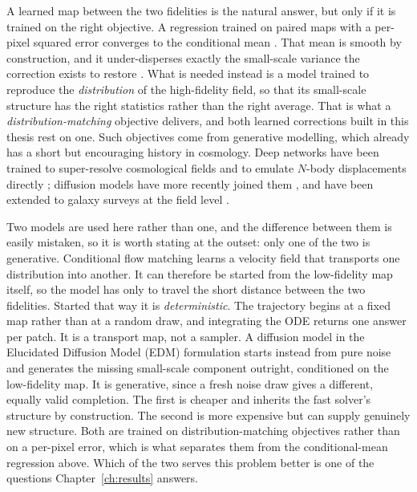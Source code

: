 \documentclass{report}
\begin{document}
A learned map between the two fidelities is the natural answer, but only if it is trained on the right objective. A regression trained on paired maps with a per-pixel squared error converges to the conditional mean \cite{hastie_elements_2009}. That mean is smooth by construction, and it under-disperses exactly the small-scale variance the correction exists to restore \cite{ledig_photo-realistic_2017}. What is needed instead is a model trained to reproduce the \emph{distribution} of the high-fidelity field, so that its small-scale structure has the right statistics rather than the right average. That is what a \emph{distribution-matching} objective delivers, and both learned corrections built in this thesis rest on one. Such objectives come from generative modelling, which already has a short but encouraging history in cosmology. Deep networks have been trained to super-resolve cosmological fields \cite{ramanah_super-resolution_2020, li_ai-assisted_2020, ni_ai-assisted_2021} and to emulate \mbox{$N$}-body displacements directly \cite{he_learning_2018, jamieson_field_2022}; diffusion models have more recently joined them \cite{mudur_can_2022, rouhiainen_super-resolution_2023}, and have been extended to galaxy surveys at the field level \cite{cuesta-lazaro_point_2024}.

Two models are used here rather than one, and the difference between them is easily mistaken, so it is worth stating at the outset: only one of the two is generative. Conditional flow matching \cite{lipman_flow_2023, liu_flow_2022} learns a velocity field that transports one distribution into another. It can therefore be started from the low-fidelity map itself, so the model has only to travel the short distance between the two fidelities. Started that way it is \emph{deterministic}. The trajectory begins at a fixed map rather than at a random draw, and integrating the ODE returns one answer per patch. It is a transport map, not a sampler. A diffusion model in the Elucidated Diffusion Model (EDM) formulation \cite{karras_elucidating_2022} starts instead from pure noise and generates the missing small-scale component outright, conditioned on the low-fidelity map. It is generative, since a fresh noise draw gives a different, equally valid completion. The first is cheaper and inherits the fast solver's structure by construction. The second is more expensive but can supply genuinely new structure. Both are trained on distribution-matching objectives rather than on a per-pixel error, which is what separates them from the conditional-mean regression above. Which of the two serves this problem better is one of the questions Chapter~\ref{ch:results} answers.
\end{document}
